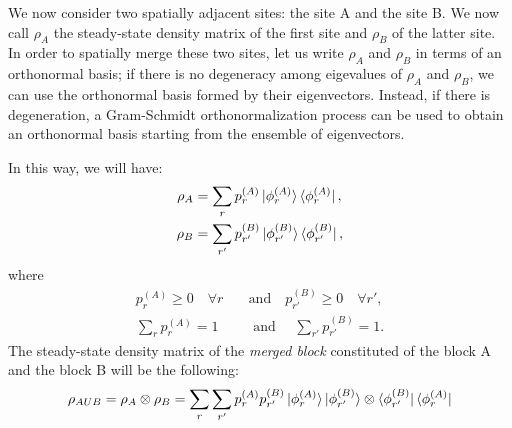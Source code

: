 We now consider two spatially adjacent sites: the site A and the site B. We now call $\rho_{A}$ the steady-state density matrix of the first site and $\rho_{B}$ of the latter site. In order to spatially merge these two sites, let us write $\rho_{A}$ and $\rho_{B}$ in terms of an orthonormal basis; if there is no degeneracy among eigevalues of $\rho_{A}$ and $\rho_B$, we can use the orthonormal basis formed by their eigenvectors. Instead, if there is degeneration, a Gram-Schmidt orthonormalization process can be used to obtain an orthonormal basis starting from the ensemble of eigenvectors.

In this way, we will have:
\begin{equation}
    \begin{split}
        \rho_A & = \sum_r p_r^{(A)}\ket{\phi_r^{(A)}}\bra{\phi_r^{(A)}}, \\
        \rho_B & = \sum_{r'} p_{r'}^{(B)}\ket{\phi_{r'}^{(B)}}\bra{\phi_{r'}^{(B)}},
    \end{split}
\end{equation}
where
\begin{equation*}
    \begin{split}
        p_r^{(A)} \geq 0 \quad \forall r \quad &\textrm{and} \quad p_{r'}^{(B)} \geq 0 \quad\forall r', \\
        \sum_{r} p_r^{(A)} = 1 \quad &\textrm{ and } \quad \sum_{r'} p_{r'}^{(B)} = 1.
    \end{split}
\end{equation*}
The steady-state density matrix of the \emph{merged block} constituted of the block A and the block B will be the following:
\begin{equation}
\label{rhoAUB}
    \rho_{AUB} = \rho_A \otimes \rho_B
    = \sum_{r} \sum_{r'} p_r^{(A)}p_{r'}^{(B)}\ket{\phi_r^{(A)}}\ket{\phi_{r'}^{(B)}} \otimes \bra{\phi_{r'}^{(B)}}\bra{\phi_{r}^{(A)}}
\end{equation}

